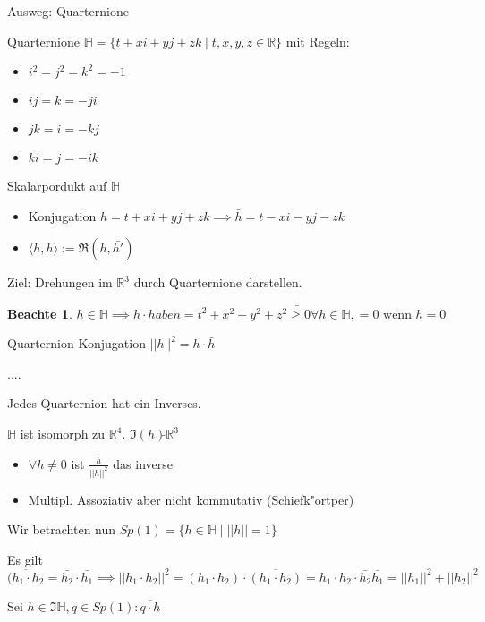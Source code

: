 \documentclass[oneside,fontsize=11pt,paper=a4,BCOR=0mm,DIV=12,automark,headsepline]{scrbook}
\theoremstyle{remark}
\theoremstyle{definition}
\newtheorem*{notte}{Beachte}
\theoremstyle{definition}
\theoremstyle{remark}
\begin{document}
Ausweg: Quarternione
\begin{definition}{Quarternione}{}
  $\mathbb{H} =\{t+xi+yj+zk \mid t,x,y,z \in \mathbb{R}\}$ mit Regeln:
  \begin{itemize}
  \item $i^2=j^2=k^2 = -1$
  \item $ij=k=-ji$
  \item $jk = i = -kj$
  \item $ki=j=-ik$
  \end{itemize}
\end{definition}
\begin{definition}{Skalarpordukt auf $\mathbb{H}$}{}
  \begin{itemize}
  \item Konjugation $h=t+xi+yj+zk \implies \bar{h}=t-xi-yj-zk$
  \item $\langle {h, h} \rangle := \Re (h, \bar{h'})$
  \end{itemize}
\end{definition}

Ziel: Drehungen im $\mathbb{R}^3$ durch Quarternione darstellen.

\begin{notte}
  $h\in \mathbb{H} \implies h\cdot \bar{haben = t^2+x^2+y^2+z^2 \geq 0 \forall h
    \in \mathbb{H}, = 0 \text{ wenn } h=0}$
\end{notte}

\begin{definition}{Quarternion Konjugation}{}
  $||h||^2 = h\cdot \bar{h}$
\end{definition}

\begin{relation}
  ....

  Jedes Quarternion hat ein Inverses.

  $\mathbb{H}$ ist isomorph zu $\mathbb{R}^4$. $\Im (h) \tilde{} \mathbb{R}^3$

  \begin{itemize}
  \item $\forall h \not= 0$  ist $\frac{\bar{h}}{||h||^2}$ das inverse
  \item Multipl. Assoziativ aber nicht kommutativ (Schiefk"ortper)
  \end{itemize}
\end{relation}

Wir betrachten nun $Sp(1)=\{h\in \mathbb{H} \mid ||h|| = 1\}$

\begin{relation}
  Es gilt $\overline{(h_1\cdot h_2}=\bar{h_2}\cdot \bar{h_1} \implies ||h_1
  \cdot h_2||^2 = (h_1 \cdot h_2) \cdot \overline{(h_1 \cdot h_2)} = h_1\cdot
  h_2 \cdot \bar{h_2} \bar{h_1} = ||h_1||^2 + ||h_2||^2$


  Sei $h\in \Im \mathbb{H}, q\in Sp(1): \overline{q\cdot h }$
\end{relation}
\end{document}
